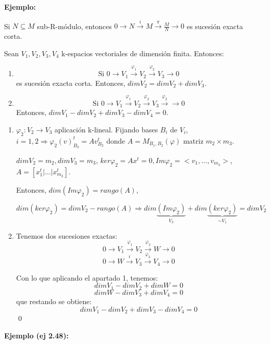 \textbf{Ejemplo: }

Si $N\subseteq M$ sub-R-módulo, entonces $0\rightarrow N \xrightarrow{i} M \xrightarrow{\pi}\frac{M}{N} \rightarrow 0$ es sucesión exacta corta. 

\begin{Prop}
Sean $V_1,V_2,V_3,V_4$ k-espacios vectoriales de dimensión finita. Entonces:
\begin{enumerate}

\item $$\text{Si } 0\rightarrow V_1 \xrightarrow{\varphi_1}V_2 \xrightarrow{\varphi_2} V_3 \rightarrow 0 $$
es sucesión exacta corta. Entonces, $dim V_2=dim V_2+dim V_3$. 

\item $$ \text{Si } 0 \rightarrow V_1 \xrightarrow{\varphi_1}V_2 \xrightarrow{\varphi_2} V_3 \xrightarrow{\varphi_2} \rightarrow 0 $$
Entonces, $dim V_1 - dim V_2 + dim V_3- dim V_4 =0$.
\end{enumerate}
\end{Prop}

\begin{Dem}
\begin{enumerate}
\item $\varphi_2: V_2 \rightarrow V_3$ aplicación k-lineal. Fijando bases $B_i$ de $V_i$, $i=1,2 \Rightarrow  \varphi_2(v)^{t}_{B_3}=Av^t_{B_2}$ donde $A=M_{B_1,B_2}(\varphi)$ matriz $m_2\times m_3$. 

$dim V_2=m_2, dim V_3 = m_3$, $ker \varphi_2= Ax^t=0, Im \varphi_2 = <v_1,\dots,v_{m_3}>$, $A=[x_1^t| \dots | x_{m_3}^t]$.

Entonces, $dim (Im \varphi_2)=rango(A)$,

$dim (ker \varphi_2)=dim V_2- rango(A) \Rightarrow dim \underbrace{(Im \varphi_2)}_{V_3}+dim \underbrace{(ker\varphi_2)}_{\sim V_1} = dim V_2$

\item  Tenemos dos sucesiones exactas:
$$0  \rightarrow V_1 \xrightarrow{\varphi_1} V_2 \xrightarrow{\varphi_2} W \rightarrow 0$$
$$0\rightarrow W \xrightarrow{i} V_3 \xrightarrow{\varphi_3} V_4 \rightarrow 0 $$

Con lo que aplicando el apartado 1, tenemos:
$$dim V_1 -dim V_2 +dim W =0 $$
$$ dim W -dim V_3 + dim V_4 =0$$
que restando se obtiene:
$$ dim V_1 - dim V_2+dim V_3 - dim V_4 = 0$$
\qed
\end{enumerate}
\end{Dem}


\textbf{Ejemplo (ej 2.48):}

